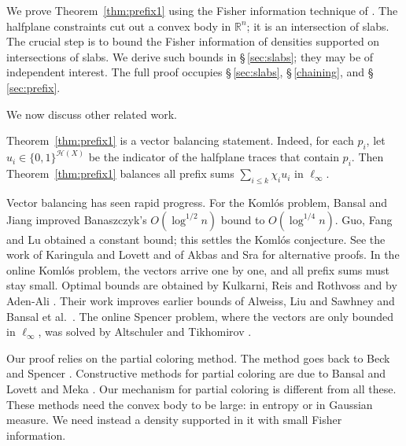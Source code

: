 \documentclass[12pt,reqno]{amsart}
\def\le{\leqslant}
\def\le{\leqslant}
\theoremstyle{remark}
\numberwithin{equation}{section}
\def \R {\mathbb{R}}
\begin{document}
We prove Theorem~\ref{thm:prefix1} using the Fisher information technique of \cite{Versh-Sm-3, Versh-Sm-4}. The halfplane constraints cut out a convex body in \(\R^n\); it is an intersection of slabs. The crucial step is to bound the Fisher information of densities supported on intersections of slabs. We derive such bounds in \S\,\ref{sec:slabs}; they may be of independent interest. The full proof occupies \S\,\ref{sec:slabs}, \S\,\ref{chaining}, and \S\,\ref{sec:prefix}.
\smallskip%

We now discuss other related work.
\smallskip%

Theorem~\ref{thm:prefix1} is a vector balancing statement. Indeed, for each \(p_i\), let \(u_i\in\{0,1\}^{\mathcal H(X)}\) be the indicator of the halfplane traces that contain \(p_i\). Then Theorem~\ref{thm:prefix1} balances all prefix sums \(\sum_{i\le k}\chi_iu_i\) in \(\ell_\infty\).
\smallskip%

Vector balancing has seen rapid progress. For the Koml\'os problem, Bansal and Jiang \cite{BansalJiang} improved Banaszczyk's \(O(\log^{1/2}n)\) bound to \(O(\log^{1/4}n)\). Guo, Fang and Lu \cite{GFL} obtained a constant bound; this settles the Koml\'os conjecture. See the work of Karingula and Lovett \cite{KarLov} and of Akbas and Sra \cite{AkbasSra-1, AkbasSra-2} for alternative proofs. In the online Koml\'os problem, the vectors arrive one by one, and all prefix sums must stay small. Optimal bounds are obtained by Kulkarni, Reis and Rothvoss \cite{Kulk-Reis-Roth} and by Aden-Ali \cite{AdenAli}. Their work improves earlier bounds of Alweiss, Liu and Sawhney \cite{AL-Saw} and Bansal et al.\ \cite{Bans-JMSS}. The online Spencer problem, where the vectors are only bounded in \(\ell_\infty\), was solved by Altschuler and Tikhomirov \cite{AltTikh-1}.
\smallskip%

Our proof relies on the partial coloring method. The method goes back to Beck \cite{Beck-3} and Spencer \cite{Spencer-6}. Constructive methods for partial coloring are due to Bansal \cite{Bansal-10} and Lovett and Meka \cite{LovMeka}. Our mechanism for partial coloring is different from all these. These methods need the convex body to be large: in entropy or in Gaussian measure. We need instead a density supported in it with small Fisher information.
\smallskip%
\end{document}
